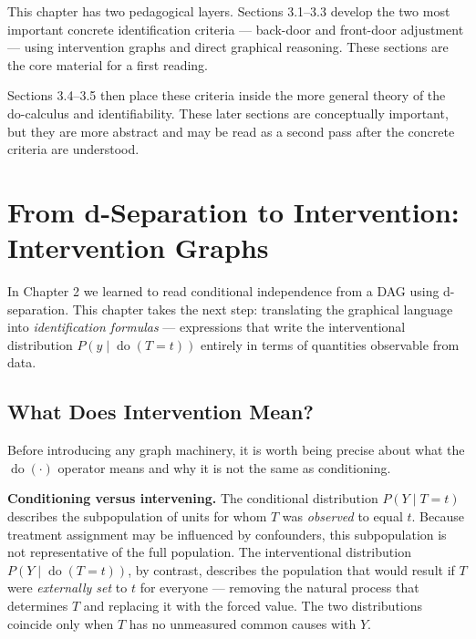 \documentclass[
  a4paper,
]{book}
\newcommand{\doop}{\operatorname{do}}
\begin{document}
\begin{tcolorbox}[enhanced jigsaw, arc=.35mm, bottomrule=.15mm, bottomtitle=1mm, breakable, colback=white, colbacktitle=quarto-callout-note-color!10!white, colframe=quarto-callout-note-color-frame, coltitle=black, left=2mm, leftrule=.75mm, opacityback=0, opacitybacktitle=0.6, rightrule=.15mm, title={How to Read This Chapter}, titlerule=0mm, toprule=.15mm, toptitle=1mm]

This chapter has two pedagogical layers. Sections 3.1--3.3 develop the
two most important concrete identification criteria --- back-door and
front-door adjustment --- using intervention graphs and direct graphical
reasoning. These sections are the core material for a first reading.

Sections 3.4--3.5 then place these criteria inside the more general
theory of the do-calculus and identifiability. These later sections are
conceptually important, but they are more abstract and may be read as a
second pass after the concrete criteria are understood.

\end{tcolorbox}

\section{From d-Separation to Intervention: Intervention
Graphs}\label{sec-mutilated}

In Chapter 2 we learned to read conditional independence from a DAG
using d-separation. This chapter takes the next step: translating the
graphical language into \emph{identification formulas} --- expressions
that write the interventional distribution \(P(y \mid \doop(T{=}t))\)
entirely in terms of quantities observable from data.

\subsection{What Does Intervention
Mean?}\label{what-does-intervention-mean}

Before introducing any graph machinery, it is worth being precise about
what the \(\doop(\cdot)\) operator means and why it is not the same as
conditioning.

\textbf{Conditioning versus intervening.} The conditional distribution
\(P(Y \mid T{=}t)\) describes the subpopulation of units for whom \(T\)
was \emph{observed} to equal \(t\). Because treatment assignment may be
influenced by confounders, this subpopulation is not representative of
the full population. The interventional distribution
\(P(Y \mid \doop(T{=}t))\), by contrast, describes the population that
would result if \(T\) were \emph{externally set} to \(t\) for everyone
--- removing the natural process that determines \(T\) and replacing it
with the forced value. The two distributions coincide only when \(T\)
has no unmeasured common causes with \(Y\).
\end{document}
